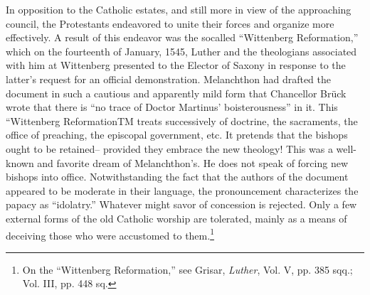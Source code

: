 In opposition to the Catholic estates, and still more in view of the
approaching council, the Protestants endeavored to unite their forces
and organize more effectively. A result of this endeavor was the socalled
“Wittenberg Reformation,” which on the fourteenth of January,
1545, Luther and the theologians associated with him at Wittenberg presented
to the Elector of Saxony in response to the latter’s
request for an official demonstration. Melanchthon had drafted the
document in such a cautious and apparently mild form that Chancellor Brück
wrote that there is “no trace of Doctor Martinus’ boisterousness” in it.
This “Wittenberg ReformationTM treats successively
of doctrine, the sacraments, the office of preaching, the episcopal government,
etc. It pretends that the bishops ought to be retained--
provided they embrace the new theology! This was a well-known and
favorite dream of Melanchthon’s. He does not speak of forcing new
bishops into office. Notwithstanding the fact that the authors of the
document appeared to be moderate in their language, the pronouncement
characterizes the papacy as “idolatry.” Whatever might savor
of concession is rejected. Only a few external forms of the old Catholic
worship are tolerated, mainly as a means of deceiving those who
were accustomed to them.\footnote
{On the “Wittenberg Reformation,” see Grisar, \textit{Luther}, Vol. V, pp. 385 sqq.; Vol. III,
pp. 448 sq.}
